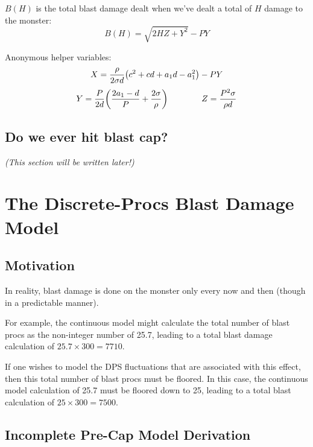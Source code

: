 \documentclass{article}
\begin{document}
$B(H)$ is the total blast damage dealt when we've dealt a total of $H$ damage to the monster:
\begin{equation}
    B (H) = \sqrt{2 H Z + Y^2} - PY
\end{equation}

Anonymous helper variables:
\begin{equation}
    X
    =
    \frac{\rho}{2 \sigma d} \parens*{c^2 + c d + a_1 d - a_1^2}
    - PY
\end{equation}
\begin{equation}
    Y
    =
    \frac{P}{2 d} 
    \parens*{
        \frac{2 a_1 - d}{P}
        + \frac{2 \sigma}{\rho} 
    }
    \qquad\qquad
    Z
    =
    \frac{P^2 \sigma}{\rho d} 
\end{equation}


\subsection{Do we ever hit blast cap?}%
\label{sub:do_we_ever_hit_blast_cap_}

\textit{(This section will be written later!)}


\newpage


\section{The Discrete-Procs Blast Damage Model}%
\label{sec:the_discrete_procs_blast_damage_model}


\subsection{Motivation}%
\label{sub:motivation}

In reality, blast damage is done on the monster only every now and then (though in a predictable manner).

For example, the continuous model might calculate the total number of blast procs as the non-integer number of 25.7, leading to a total blast damage calculation of $25.7 \times 300 = 7710$.

If one wishes to model the DPS fluctuations that are associated with this effect, then this total number of blast procs must be floored. In this case, the continuous model calculation of 25.7 must be floored down to 25, leading to a total blast calculation of $25 \times 300 = 7500$.


\subsection{Incomplete Pre-Cap Model Derivation}%
\label{sub:dbm_pre_cap_model_derivation}
\end{document}
